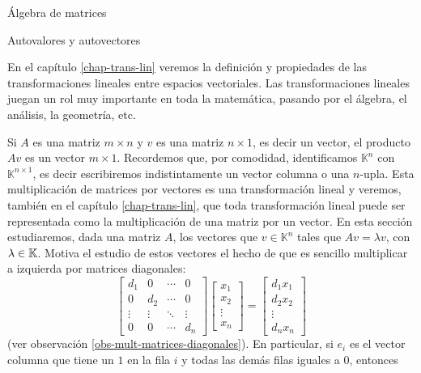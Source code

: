 \begin{chapter}{\'Algebra de matrices}
\begin{section}{Autovalores y autovectores}\label{seccion-autovalores-y-autovectores-de-matrices}


    En el capítulo \ref{chap-trans-lin} veremos la definición y propiedades de las transformaciones lineales entre espacios vectoriales. Las transformaciones lineales juegan un rol muy importante en toda la matemática, pasando por el álgebra, el análisis, la geometría, etc. 

    Si $A$  es una matriz $m \times n$ y $v$  es una matriz $n \times 1$,  es decir un vector,  el producto $Av$ es un vector $ m \times 1$. Recordemos que, por comodidad, identificamos $\mathbb K^{n}$ con  $\mathbb K^{n \times 1}$,  es decir escribiremos indistintamente un vector columna o una $n$-upla. Esta multiplicación de matrices por vectores es una transformación lineal y veremos, también en el capítulo \ref{chap-trans-lin}, que toda transformación lineal puede ser  representada  como la multiplicación de una matriz por  un vector. En esta sección estudiaremos,  dada una matriz $A$, los vectores que $v \in \mathbb K^{n}$ tales que $Av = \lambda v$,  con  $\lambda \in \mathbb K$. Motiva el estudio de estos vectores el hecho de que es  sencillo multiplicar a izquierda por matrices diagonales:
    \begin{equation*}
        \begin{bmatrix}
            d_1 & 0 & \cdots &0 \\
            0 & d_2 & \cdots &0 \\
            \vdots & \vdots & \ddots &\vdots \\
            0 & 0 & \cdots & d_n 
            \end{bmatrix}
        \begin{bmatrix}
            x_1\\x_2 \\\vdots \\x_n
        \end{bmatrix}
        = \begin{bmatrix}
            d_1x_1\\d_2x_2 \\\vdots \\d_nx_n
        \end{bmatrix}
    \end{equation*} 
    (ver observación \ref{obs-mult-matrices-diagonales}). En particular,  si $e_i$  es el vector columna  que tiene un $1$ en la fila $i$ y todas las demás filas iguales a $0$,  entonces
    \begin{equation*}

\end{equation*}
\end{section}
\end{chapter}
